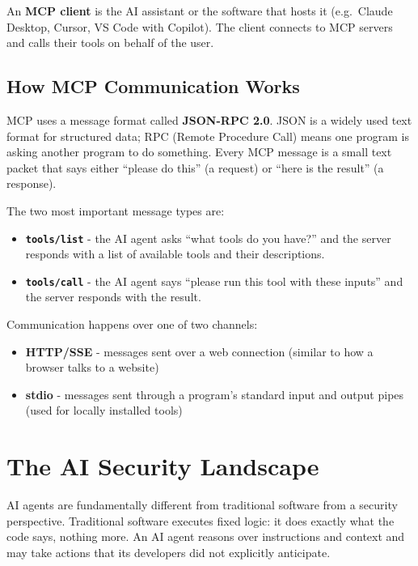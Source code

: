 \documentclass[12pt,a4paper]{report}
\begin{document}
\begin{definitionbox}
An \textbf{MCP client} is the AI assistant or the software that hosts it
(e.g.\ Claude Desktop, Cursor, VS Code with Copilot). The client connects to
MCP servers and calls their tools on behalf of the user.
\end{definitionbox}

\subsection{How MCP Communication Works}

MCP uses a message format called \textbf{JSON-RPC 2.0}. JSON is a widely used
text format for structured data; RPC (Remote Procedure Call) means one
program is asking another program to do something. Every MCP message is a
small text packet that says either ``please do this'' (a request) or
``here is the result'' (a response).

The two most important message types are:

\begin{itemize}
  \item \textbf{\texttt{tools/list}} - the AI agent asks ``what tools do you have?''
    and the server responds with a list of available tools and their descriptions.
  \item \textbf{\texttt{tools/call}} - the AI agent says ``please run this tool
    with these inputs'' and the server responds with the result.
\end{itemize}

Communication happens over one of two channels:
\begin{itemize}
  \item \textbf{HTTP/SSE} - messages sent over a web connection (similar to
    how a browser talks to a website)
  \item \textbf{stdio} - messages sent through a program's standard input and
    output pipes (used for locally installed tools)
\end{itemize}

\section{The AI Security Landscape}

AI agents are fundamentally different from traditional software from a security
perspective. Traditional software executes fixed logic: it does exactly what
the code says, nothing more. An AI agent reasons over instructions and context
and may take actions that its developers did not explicitly anticipate.
\end{document}
